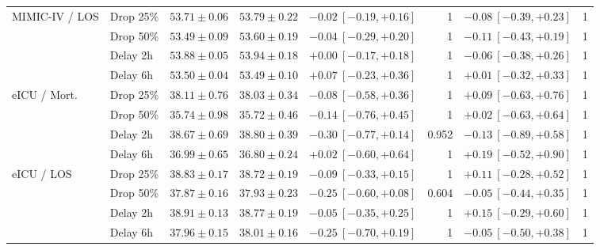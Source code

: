 \begin{table}[!t]
\begin{tabular}{llrrrrrr}
\midrule
MIMIC-IV / LOS & Drop 25\% & $53.71\pm0.06$ & $53.79\pm0.22$ & $-0.02\ [-0.19,+0.16]$ & 1 & $-0.08\ [-0.39,+0.23]$ & 1 \\
 & Drop 50\% & $53.49\pm0.09$ & $53.60\pm0.19$ & $-0.04\ [-0.29,+0.20]$ & 1 & $-0.11\ [-0.43,+0.19]$ & 1 \\
 & Delay 2h & $53.88\pm0.05$ & $53.94\pm0.18$ & $+0.00\ [-0.17,+0.18]$ & 1 & $-0.06\ [-0.38,+0.26]$ & 1 \\
 & Delay 6h & $53.50\pm0.04$ & $53.49\pm0.10$ & $+0.07\ [-0.23,+0.36]$ & 1 & $+0.01\ [-0.32,+0.33]$ & 1 \\
\midrule
eICU / Mort. & Drop 25\% & $38.11\pm0.76$ & $38.03\pm0.34$ & $-0.08\ [-0.58,+0.36]$ & 1 & $+0.09\ [-0.63,+0.76]$ & 1 \\
 & Drop 50\% & $35.74\pm0.98$ & $35.72\pm0.46$ & $-0.14\ [-0.76,+0.45]$ & 1 & $+0.02\ [-0.63,+0.64]$ & 1 \\
 & Delay 2h & $38.67\pm0.69$ & $38.80\pm0.39$ & $-0.30\ [-0.77,+0.14]$ & 0.952 & $-0.13\ [-0.89,+0.58]$ & 1 \\
 & Delay 6h & $36.99\pm0.65$ & $36.80\pm0.24$ & $+0.02\ [-0.60,+0.64]$ & 1 & $+0.19\ [-0.52,+0.90]$ & 1 \\
\midrule
eICU / LOS & Drop 25\% & $38.83\pm0.17$ & $38.72\pm0.19$ & $-0.09\ [-0.33,+0.15]$ & 1 & $+0.11\ [-0.28,+0.52]$ & 1 \\
 & Drop 50\% & $37.87\pm0.16$ & $37.93\pm0.23$ & $-0.25\ [-0.60,+0.08]$ & 0.604 & $-0.05\ [-0.44,+0.35]$ & 1 \\
 & Delay 2h & $38.91\pm0.13$ & $38.77\pm0.19$ & $-0.05\ [-0.35,+0.25]$ & 1 & $+0.15\ [-0.29,+0.60]$ & 1 \\
 & Delay 6h & $37.96\pm0.15$ & $38.01\pm0.16$ & $-0.25\ [-0.70,+0.19]$ & 1 & $-0.05\ [-0.50,+0.38]$ & 1 \\
\bottomrule
\end{tabular}
\end{table}

